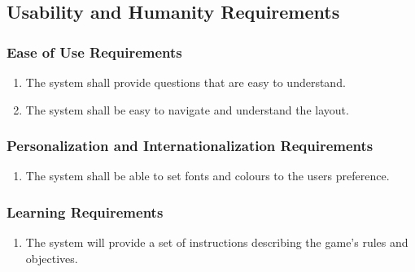 \documentclass[titlepage]{article}
\newcounter{req}
\begin{document}
		
		\subsection{Usability and Humanity Requirements}
		\setcounter{req}{0}
		\label{sub:usability_and_humanity_requirements}
		
		
		\subsubsection{Ease of Use Requirements}
		\label{ssub:ease_of_use_requirements}
		\begin{enumerate}[{UH}1.]
		\setcounter{enumi}{\value{req}}
			\item 
			The system shall provide questions that are easy to understand.
			\item
			The system shall be easy to navigate and understand the layout.
		\setcounter{req}{\theenumi}
		\end{enumerate}
		
		\subsubsection{Personalization and Internationalization Requirements}
		\label{ssub:personalization_and_internationalization_requirements}
		\begin{enumerate}[{UH}1. ]
		\setcounter{enumi}{\value{req}}
			\item
			The system shall be able to set fonts and colours to the users preference.
		\setcounter{req}{\theenumi}
		\end{enumerate}
		
		\subsubsection{Learning Requirements}
		\label{ssub:learning_requirements}
		\begin{enumerate}[{UH}1. ]
		\setcounter{enumi}{\value{req}}
			\item
			The system will provide a set of instructions describing the game's rules and objectives.
		\setcounter{req}{\theenumi}
		\end{enumerate}
		
\end{document}
